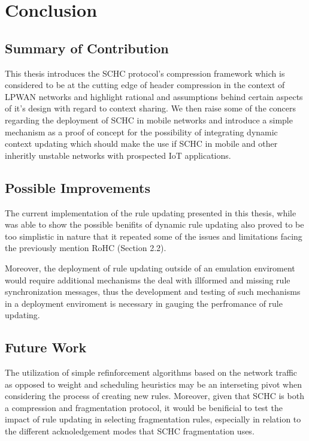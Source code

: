\documentclass[12pt]{dalthesis}
\begin{document}
\chapter{Conclusion}
	\section{Summary of Contribution}
	This thesis introduces the SCHC protocol's compression framework which is considered to be 
	at the cutting edge of header compression in the context of LPWAN networks and highlight rational and assumptions behind certain aspects of 
	it's design with regard to context sharing. We then raise some of the concers regarding the deployment of SCHC in mobile networks and introduce a
	simple mechanism as a proof of concept for the possibility of integrating dynamic context updating which should make the use if SCHC in 
	mobile and other inheritly unstable networks with prospected IoT applications.

	\section{Possible Improvements}
	The current implementation of the rule updating presented in this thesis, while was able to show the possible benifits of dynamic rule updating
	also proved to be too simplistic in nature that it repeated some of the issues and limitations facing the previously mention RoHC (Section 2.2).
	
	Moreover, the deployment of rule updating outside of an emulation enviroment would require additional mechanisms the deal with illformed and missing
	rule synchronization messages, thus the development and testing of 
	such mechanisms in a deployment enviroment is necessary in gauging the perfromance of rule updating. 

	\section{Future Work}
	The utilization of simple refinforcement algorithms based on the network traffic as opposed to weight and scheduling heuristics may be an interseting
	pivot when considering the process of creating new rules. Moreover, given that SCHC is both a compression and fragmentation protocol, it would
	be benificial to test the impact of rule updating in selecting fragmentation rules, especially in relation to the different acknoledgement 
	modes that SCHC fragmentation uses.

	

\end{document}
